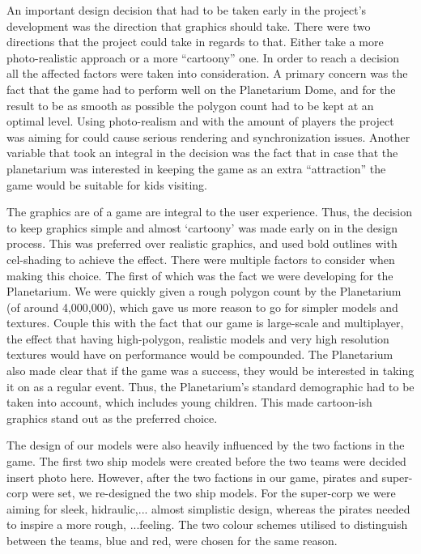 \documentclass[11pt,a4paper]{article}
\begin{document}
        An important design decision that had to be taken early in the project's development was the direction that graphics should take. There were two directions that the project could take in regards to that. Either take a more photo-realistic approach or a more “cartoony” one. In order to reach a decision all the affected factors were taken into consideration. A primary concern was the fact that the game had to perform well on the Planetarium Dome, and for the result to be as smooth as possible the polygon count had to be kept at an optimal level. Using photo-realism and with the amount of players the project was aiming for could cause serious rendering and synchronization issues.
        Another variable that took an integral in the decision was the fact that in case that the planetarium was interested in keeping the game as an extra “attraction” the game would be suitable for kids visiting.


        The graphics are of a game are integral to the user experience. Thus, the decision to keep graphics simple and almost ‘cartoony’ was made early on in the design process. This was preferred over realistic graphics, and used bold outlines with cel-shading to achieve the effect. There were multiple factors to consider when making this choice. The first of which was the fact we were developing for the Planetarium. We were quickly given a rough polygon count by the Planetarium (of around 4,000,000), which gave us more reason to go for simpler models and textures. Couple this with the fact that our game is large-scale and multiplayer, the effect that having high-polygon, realistic models and very high resolution textures would have on performance would be compounded. The Planetarium also made clear that if the game was a success, they would be interested in taking it on as a regular event. Thus, the Planetarium’s standard demographic had to be taken into account, which includes young children. This made cartoon-ish graphics stand out as the preferred choice.  

        The design of our models were also heavily influenced by the two factions in the game. The first two ship models were created before the two teams were decided {insert photo here}. However, after the two factions in our game, pirates and super-corp were set, we re-designed the two ship models. For the super-corp we were aiming for sleek, hidraulic,... almost simplistic design, whereas the pirates needed to inspire a more rough, ...feeling. The two colour schemes utilised to distinguish between the teams, blue and red, were chosen for the same reason. 
\end{document}
